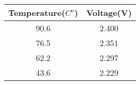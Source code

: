  

\begin{tabular}{|c|c|}
\hline
Temperature($C^o$)&Voltage(V)\\
\hline
90.6&2.400\\
\hline
76.5&2.351\\
\hline
62.2&2.297\\
\hline
43.6&2.229\\
\hline

\end{tabular}

 



